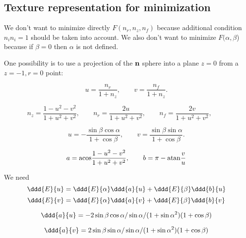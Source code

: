 \subsection*{Texture representation for minimization}

We don't want to minimize directly $F(n_r, n_z, n_f)$ because additional
condition $n_i n_i = 1$ should be taken into account. We also don't want
to minimize $F(\alpha, \beta$) because if $\beta=0$ then $\alpha$
is not defined.

One possibility is to use a projection of the $\bf n$ sphere into a plane
$z=0$ from a $z=-1, r=0$ point:

$$
u=\frac{n_r}{1+n_z}, \qquad  v=\frac{n_f}{1+n_z}.
$$

$$
n_z = \frac{1-u^2-v^2}{1+u^2+v^2},\qquad
n_r = \frac{2u}{1+u^2+v^2},\qquad
n_f = \frac{2v}{1+u^2+v^2},\qquad
$$

\def\cb{\cos\beta}
\def\sb{\sin\beta}
\def\ca{\cos\alpha}
\def\sa{\sin\alpha}

$$
u=-\frac{\sb\ca}{1+\cb}, \qquad  v=\frac{\sb\sa}{1+\cb}.
$$

$$
a={\rm acos}\frac{1-u^2-v^2}{1+u^2+v^2}, \qquad b=\pi-{\rm atan}\frac{v}{u}
$$


We need
$$
\ddd{E}{u} = \ddd{E}{\alpha}\ddd{a}{u} + \ddd{E}{\beta}\ddd{b}{u}
$$
$$
\ddd{E}{v} = \ddd{E}{\alpha}\ddd{a}{v} + \ddd{E}{\beta}\ddd{b}{v}
$$

$$
\ddd{a}{u} = -2\sb\ca/\sa  / (1+\sa^2)(1+\cb)
$$

$$
\ddd{a}{v} = 2\sb\sa/\sa  / (1+\sa^2)(1+\cb)
$$



